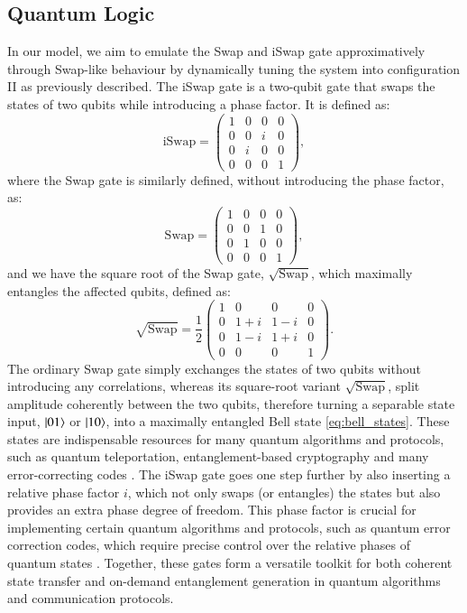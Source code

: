 \documentclass{subfiles}
\begin{document}
\subsection{Quantum Logic}
In our model, we aim to emulate the Swap and iSwap gate approximatively through Swap-like behaviour by dynamically tuning the system into configuration II as previously described. The iSwap gate is a two-qubit gate that swaps the states of two qubits while introducing a phase factor. It is defined as:
\begin{equation}
    \text{iSwap} = \begin{pmatrix}
    1 & 0 & 0 & 0 \\
    0 & 0 & i & 0 \\
    0 & i & 0 & 0 \\
    0 & 0 & 0 & 1
    \end{pmatrix} \label{eq:iswap_gate},
\end{equation}
where the Swap gate is similarly defined, without introducing the phase factor, as:
\begin{equation}
    \text{Swap} = \begin{pmatrix}
    1 & 0 & 0 & 0 \\
    0 & 0 & 1 & 0 \\
    0 & 1 & 0 & 0 \\
    0 & 0 & 0 & 1
    \end{pmatrix} \label{eq:swap_gate},
\end{equation}
and we have the square root of the Swap gate, $\sqrt{\text{Swap}}$, which maximally entangles the affected qubits, defined as:
\begin{equation}
    \sqrt{\text{Swap}} = \frac{1}{2}\begin{pmatrix}
    1 & 0 & 0 & 0 \\
    0 & 1+i & 1-i & 0 \\
    0 & 1-i & 1+i & 0 \\
    0 & 0 & 0 & 1
    \end{pmatrix} \label{eq:sqrt_swap_gate}.
\end{equation}
The ordinary Swap gate simply exchanges the states of two qubits without introducing any correlations, whereas its square-root variant $\sqrt{\text{Swap}}$, split amplitude coherently between the two qubits, therefore turning a separable state input, $\ket{01}$ or $\ket{10}$, into a maximally entangled Bell state \eqref{eq:bell_states}. These states are indispensable resources for many quantum algorithms and protocols, such as quantum teleportation, entanglement-based cryptography and many error-correcting codes \cite{nielsen2010quantum, bouwmeester1997experimental, yin2020entanglement}. The iSwap gate goes one step further by also inserting a relative phase factor $i$, which not only swaps (or entangles) the states but also provides an extra phase degree of freedom. This phase factor is crucial for implementing certain quantum algorithms and protocols, such as quantum error correction codes, which require precise control over the relative phases of quantum states \cite{tanamoto2008efficient, shor1996fault}. Together, these gates form a versatile toolkit for both coherent state transfer and on-demand entanglement generation in quantum algorithms and communication protocols. 
\end{document}
